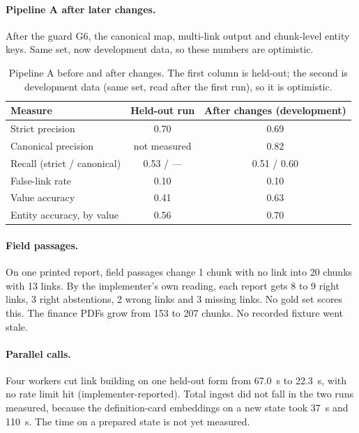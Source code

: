 \documentclass[11pt,a4paper]{article}
\begin{document}
\paragraph{Pipeline A after later changes.} After the guard G6, the canonical map, multi-link output and chunk-level entity keys. Same set, now development data, so these numbers are optimistic.
\begin{table}[H]
\centering\small
\caption{Pipeline A before and after changes. The first column is held-out; the second is development data (same set, read after the first run), so it is optimistic.}
\label{tab:pipeA-dev}
\begin{tabular}{lcc}
\toprule
Measure & Held-out run & After changes (development)\\\midrule
Strict precision & 0.70 & 0.69\\
Canonical precision & not measured & 0.82\\
Recall (strict / canonical) & 0.53 / --- & 0.51 / 0.60\\
False-link rate & 0.10 & 0.10\\
Value accuracy & 0.41 & 0.63\\
Entity accuracy, by value & 0.56 & 0.70\\
\bottomrule
\end{tabular}
\end{table}



\paragraph{Field passages.} On one printed report, field passages change 1 chunk with no link into 20 chunks with 13 links. By the implementer's own reading, each report gets 8 to 9 right links, 3 right abstentions, 2 wrong links and 3 missing links. No gold set scores this. %
The finance PDFs grow from 153 to 207 chunks. No recorded fixture went stale. %

\paragraph{Parallel calls.} Four workers cut link building on one held-out form from 67.0~s to 22.3~s, with no rate limit hit (implementer-reported). Total ingest did not fall in the two runs measured, because the definition-card embeddings on a new state took 37~s and 110~s. The time on a prepared state is not yet measured. %
\end{document}
